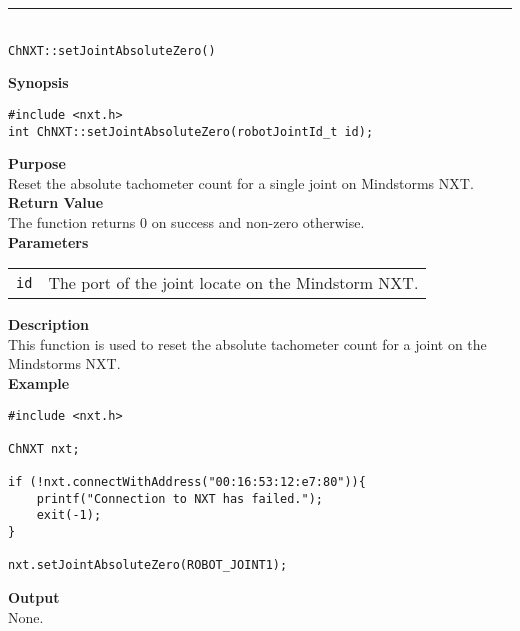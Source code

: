 \noindent
\vspace{5pt}
\rule{4.5in}{0.015in}\\
\noindent
{\LARGE \texttt{ChNXT::setJointAbsoluteZero()} }\\


\noindent
{\bf Synopsis}
\begin{lstlisting}
#include <nxt.h>
int ChNXT::setJointAbsoluteZero(robotJointId_t id);
\end{lstlisting}

\noindent
{\bf Purpose}\\
Reset the absolute tachometer count for a single joint on Mindstorms NXT.\\

\noindent
{\bf Return Value}\\
The function returns 0 on success and non-zero otherwise.\\

\noindent
{\bf Parameters}\\
\vspace{-0.1in}
\begin{description}
\item
\begin{tabular}{p{20mm}p{135mm}}
\texttt{id} &The port of the joint locate on the Mindstorm NXT.\\
\end{tabular}
\end{description}

\noindent
{\bf Description}\\
This function is used to reset the absolute tachometer count for a joint on the Mindstorms NXT.\\

\noindent
{\bf Example}
\begin{lstlisting}
#include <nxt.h> 

ChNXT nxt;

if (!nxt.connectWithAddress("00:16:53:12:e7:80")){
    printf("Connection to NXT has failed.");
    exit(-1);
}
    
nxt.setJointAbsoluteZero(ROBOT_JOINT1);
\end{lstlisting}

\noindent
{\bf Output}\\
None.\\
\\
